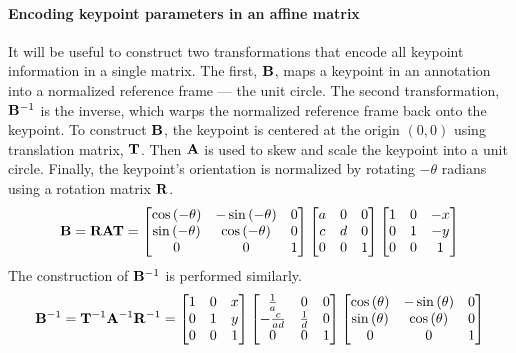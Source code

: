         \paragraph{Encoding keypoint parameters in an affine matrix}
        It will be useful to construct two transformations that encode all keypoint information in a single matrix.
        The first, $\mathbf{B}$, maps a keypoint in an annotation into a normalized reference frame --- the unit
        circle. The second transformation, $\mathbf{B}^{-1}$ is the inverse, which warps the normalized reference
        frame back onto the keypoint. To construct $\mathbf{B}$, the keypoint is centered at the origin $(0, 0)$ using
        translation matrix, $\mathbf{T}$. Then $\mathbf{A}$ is used to skew and scale the keypoint into a unit circle.
        Finally, the keypoint's orientation is normalized by rotating $-\theta$ radians using a rotation matrix
        $\mathbf{R}$.
        \begin{equation}\label{eqn:RVTConstruct}
            \mathbf{B}=\mathbf{R} \mathbf{A} \mathbf{T} =  \left[ \begin{matrix}  \cos{\left(-\theta\right)} & -\sin{\left(-\theta\right)} & 0\\ \sin{\left(-\theta\right)} & \cos{\left(-\theta\right)} & 0\\ 0 & 0 & 1  \end{matrix} \right]   \left[ \begin{matrix} a & 0 & 0\\c & d & 0 \\ 0 & 0 & 1 \end{matrix} \right]   \left[ \begin{matrix}  1 & 0 & -x\\ 0 & 1 & -y\\ 0 & 0 & 1  \end{matrix} \right] 
        \end{equation}
        The construction of $\mathbf{B}^{-1}$ is performed similarly.
        \begin{equation}\label{eqn:invTVRConstruct}
             \mathbf{B}^{-1} = \mathbf{T}^{-1} \mathbf{A}^{-1} \mathbf{R}^{-1} = 
              \left[ \begin{matrix}  1 & 0 & x\\ 0 & 1 & y\\ 0 & 0 & 1  \end{matrix} \right] 
              \left[ \begin{matrix} 
                \frac{1}{a}     & 0               & 0\\
                -\frac{c}{a d}  & \frac{1}{d}     & 0\\
                0               & 0               & 1
                 \end{matrix} \right] 
              \left[ \begin{matrix}  \cos{\left(\theta\right)} & -\sin{\left(\theta\right)} & 0\\ \sin{\left(\theta\right)} & \cos{\left(\theta\right)} & 0\\ 0 & 0 & 1  \end{matrix} \right] 
        \end{equation}

